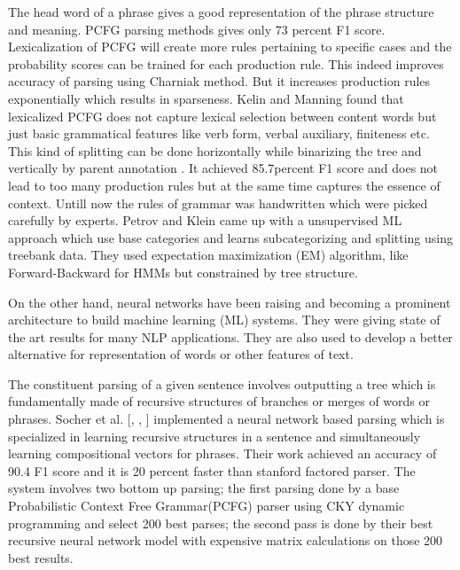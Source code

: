\documentclass[a4paper, 11pt]{article}
\begin{document}
The head word of a phrase gives a good representation of the phrase structure and meaning. 
PCFG parsing methods gives only 73 percent F1 score. Lexicalization of PCFG will create more rules pertaining to specific cases and the probability scores can be trained for each production rule. This indeed improves accuracy of parsing using Charniak method. But it increases production rules exponentially which results in sparseness. Kelin and Manning found that lexicalized PCFG does not capture lexical selection between content words but just basic grammatical features like verb form, verbal auxiliary, finiteness etc. This kind of splitting can be done horizontally while binarizing the tree and vertically by parent annotation \parencite{Gaddy2018}. It achieved 85.7percent F1 score and does not lead to too many production rules but at the same time captures the essence of context. Untill now the rules of grammar was handwritten which were picked carefully by experts. Petrov and Klein came up with a unsupervised ML approach which use base categories and learns subcategorizing and splitting using treebank data. They used expectation maximization (EM) algorithm, like Forward-Backward for HMMs but constrained by tree structure. 

On the other hand, neural networks have been raising and becoming a prominent architecture to build machine learning (ML) systems. They were giving state of the art results for many NLP applications. They are also used to develop a better alternative for representation of words or other features of text. 

The constituent parsing of a given sentence involves outputting a tree which is fundamentally made of recursive structures of branches or merges of words or phrases. Socher et al. [\parencite*{RichardSocher2011}, \parencite*{Socher}, \parencite*{Sochera}] implemented a neural network based parsing which is specialized in learning recursive structures in a sentence and simultaneously learning compositional vectors for phrases. Their work achieved an accuracy of 90.4 F1 score and it is 20 percent faster than stanford factored parser. The system involves two bottom up parsing; the first parsing done by a base Probabilistic Context Free Grammar(PCFG) parser using CKY dynamic programming and select 200 best parses; the second pass is done by their best recursive neural network model with expensive matrix calculations on those 200 best results. 

\end{document}
